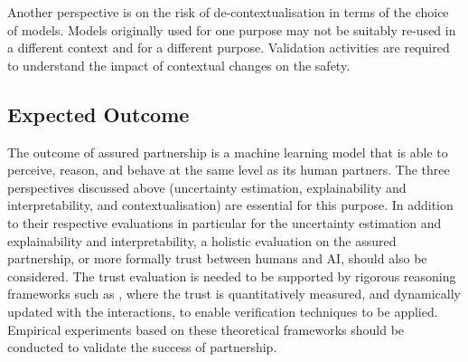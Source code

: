 Another perspective is on the risk of de-contextualisation in terms of the choice of models. Models originally used for one purpose may not be suitably re-used in a different context and for a different purpose. Validation activities are required to understand the impact of contextual changes on the safety. 

\subsection*{Expected Outcome}

The outcome of assured partnership is a machine learning model that is able to perceive, reason, and behave at the same level as its human partners. The three perspectives discussed above (uncertainty estimation, explainability and interpretability, and contextualisation) are essential for this purpose. In addition to their respective evaluations in particular for the uncertainty estimation and explainability and interpretability, a holistic evaluation on the assured partnership, or more formally trust between humans and AI, should also be considered. The trust evaluation is needed to be supported by rigorous reasoning frameworks such as \cite{10.1145/3329123},  where the trust is quantitatively measured, and dynamically updated with the interactions, to enable verification techniques to be applied.
Empirical experiments based on these theoretical frameworks should be conducted to validate the success of partnership. 
